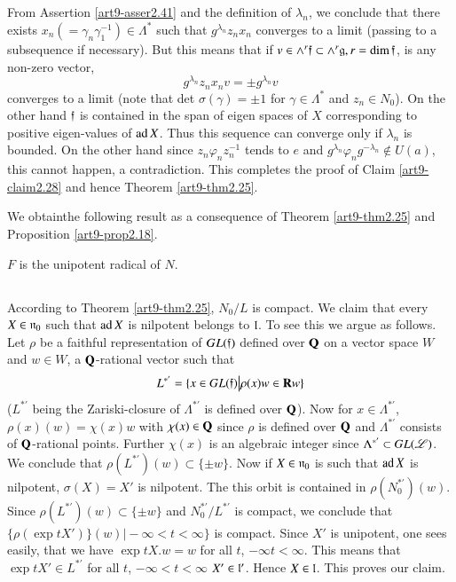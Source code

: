 \subsection{}\label{art9-subsec42}
From Assertion \ref{art9-asser2.41} and the definition of $\lambda_n$, we conclude that there exists $x_n (=\gamma_n \gamma_1^{-1}) \in \Lambda^\ast$ such that $g^{\lambda_n} z_n x_n$ converges to a limit (passing to a subsequence if necessary). But this means that if $v \in \wedge^r \mathfrak{f} \subset \wedge^r \mathfrak{g}, r = \dim \mathfrak{f}$, is any non-zero vector,
$$
g^{\lambda_n} z_n x_n v = \pm g^{\lambda_n} v
$$
converges to a limit (note that det $\sigma (\gamma) = \pm 1$ for $\gamma \in \Lambda^\ast$ and $z_n\in N_0$). On the other hand $\mathfrak{f}$ is contained in the span of eigen spaces of $X$ corresponding to positive eigen-values of $\operatorname{ad} X$. Thus this sequence can converge only if $\lambda_n$ is bounded. On the other hand since $z_n \varphi_n z_n^{-1}$  tends to $e$ and $g^{\lambda_n} \varphi_n g^{-\lambda_n} \not\in U (a)$, this cannot happen, a contradiction. This completes the proof of Claim \ref{art9-claim2.28} and hence Theorem \ref{art9-thm2.25}.

We obtain\pageoriginale the following result as a consequence of Theorem \ref{art9-thm2.25} and Proposition \ref{art9-prop2.18}.

\setcounter{definition}{42}
\begin{theorem}\label{art9-thm2.43}
$F$ is the unipotent radical of $N$.
\end{theorem}

\setcounter{subsection}{43}
\subsection{}\label{art9-subsec2.44}
According to Theorem \ref{art9-thm2.25}, $N_0 / L$ is compact. We claim that every $X \in \mathfrak{n}_0$ such that $\operatorname{ad} X$ is nilpotent belongs to $\mathfrak{l}$. To see this we argue as follows. Let $\rho$ be a faithful representation of $GL(\mathfrak{f})$ defined over $\mathbf{Q}$ on a vector space $W$ and $w \in W$, a $\mathbf{Q}$-rational vector such that 
$$
L^{\ast'} = \{x \in G L (\mathfrak{f}) \big| \rho (x)w \in \mathbf{R} w\}
$$
($L^{\ast'}$ being the Zariski-closure of $\Lambda^{\ast'}$ is defined over $\mathbf{Q}$). Now for $x \in \Lambda^{\ast'}$, $\rho (x) (w) = \chi (x) w$ with $\chi (x) \in \mathbf{Q}$ since $\rho$ is defined over $\mathbf{Q}$ and $\Lambda^{\ast'}$ consists of $\mathbf{Q}$-rational points. Further $\chi (x)$ is an algebraic integer since $\Lambda^{\ast'} \subset GL (\mathscr{L})$. We conclude that $\rho (L^{\ast'}) (w) \subset \{\pm w\}$. Now if $X \in \mathfrak{n}_0$ is such that $\operatorname{ad} X$ is nilpotent, $\sigma (X) = X'$ is nilpotent. The this orbit is contained in $ \rho (N^{\ast'}_0) (w)$. Since $\rho (L^{\ast'}) (w) \subset \{\pm w\}$ and $N^{\ast'}_0 / L^{\ast'}$ is compact, we conclude that $\{\rho (\exp t X')\} (w) \big| - \infty < t < \infty\}$ is compact. Since $X'$ is unipotent, one sees easily, that we have $\exp t X. w = w$ for all $t$, $-\infty t < \infty$. This means that $\exp t X' \in L^{\ast'}$ for all $t$, $-\infty < t < \infty$ \ie $X' \in \mathfrak{l}'$. Hence $X \in \mathfrak{l}$. This proves our claim.

